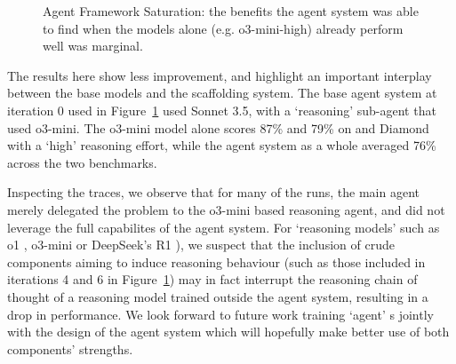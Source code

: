 \begin{figure}[htbp]
    \caption{Agent Framework Saturation: the benefits the agent system was able
      to find when the models alone (e.g. o3-mini-high) already perform well was
      marginal.}
    \label{fig:aime_gpqa}
\end{figure}

The results here show less improvement, and highlight an important interplay
between the base models and the scaffolding system. The base agent system at
iteration 0 used in Figure~\ref{fig:aime_gpqa} used Sonnet 3.5, with a
`reasoning' sub-agent that used o3-mini. The o3-mini model alone scores 87\% and
79\% on  and  Diamond with a `high' reasoning effort, while
the agent system as a whole averaged 76\% across the two benchmarks.

Inspecting the traces, we observe that for many of the runs, the main agent
merely delegated the problem to the o3-mini based reasoning agent, and did not
leverage the full capabilites of the agent system. For `reasoning models' such
as o1 \citep{openaiOpenAIO1System}, o3-mini or DeepSeek's R1
\citep{deepseek-aiDeepSeekR1IncentivizingReasoning2025}), we suspect that the
inclusion of crude components aiming to induce reasoning behaviour (such as
those included in iterations 4 and 6 in Figure~\ref{fig:aime_gpqa}) may in fact
interrupt the reasoning chain of thought of a reasoning model trained outside
the agent system, resulting in a drop in performance. We look forward to future
work training `agent' s jointly with the design of the agent system
which will hopefully make better use of both components' strengths.

